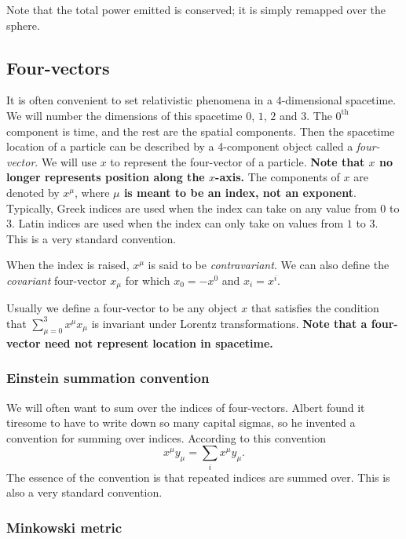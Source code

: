 \documentclass{article}
\begin{document}
Note that the total power emitted is conserved; it is simply remapped over the sphere.

\subsection*{Four-vectors}

It is often convenient to set relativistic phenomena in a 4-dimensional spacetime. We will number the dimensions of this spacetime $0$, $1$, $2$ and $3$. The $0^\mathrm{th}$ component is time, and the rest are the spatial components. Then the spacetime location of a particle can be described by a 4-component object called a \emph{four-vector}. We will use $x$ to represent the four-vector of a particle. {\bf Note that $x$ no longer represents position along the $x$-axis.} The components of $x$ are denoted by $x^\mu$, where {\bf $\mu$ is meant to be an index, not an exponent}. Typically, Greek indices are used when the index can take on any value from $0$ to $3$. Latin indices are used when the index can only take on values from $1$ to $3$. This is a very standard convention.

When the index is raised, $x^\mu$ is said to be \emph{contravariant}. We can also define the \emph{covariant} four-vector $x_\mu$ for which $x_0 = - x^0$ and $x_i = x^i$.

Usually we define a four-vector to be any object $x$ that satisfies the condition that $ \sum\limits_{\mu = 0}^3 x^\mu x_\mu $ is invariant under Lorentz transformations. {\bf Note that a four-vector need not represent location in spacetime.}

\subsubsection*{Einstein summation convention}

We will often want to sum over the indices of four-vectors. Albert found it tiresome to have to write down so many capital sigmas, so he invented a convention for summing over indices. According to this convention \begin{equation} x^\mu y_\mu = \sum\limits_i x^\mu y_\mu . \end{equation} The essence of the convention is that repeated indices are summed over. This is also a very standard convention.

\subsubsection*{Minkowski metric}
\end{document}
